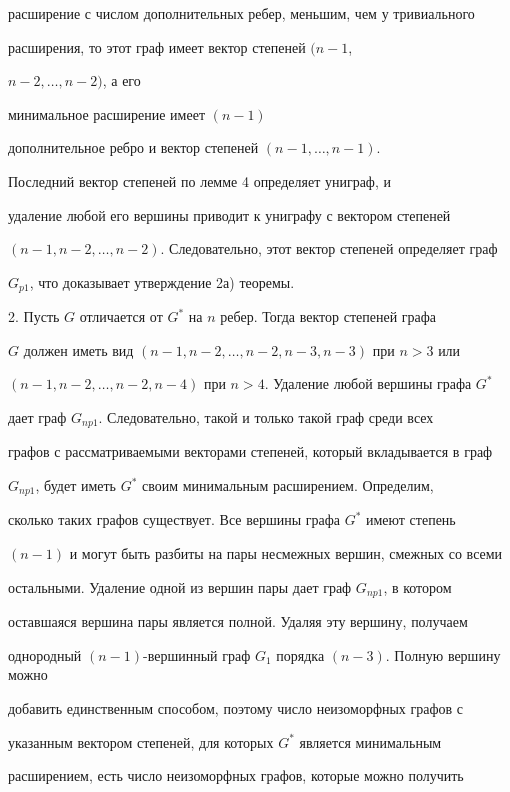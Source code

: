 \begin{pf}
расширение с числом дополнительных ребер, меньшим, чем у тривиального


расширения, то этот граф имеет вектор степеней $(n-1$,\linebreak




$n-2,\dotsc,n-2)$, а его


минимальное расширение имеет $(n-1)$


дополнительное ребро и вектор степеней $(n-1,\dotsc,n-1)$. 


Последний вектор степеней по лемме 4 определяет униграф, и


удаление любой его вершины приводит к униграфу с вектором степеней


$(n-1,n-2,\dotsc,n-2)$. Следовательно, этот вектор степеней определяет граф


$G_{p1}$, что доказывает утверждение 2а) теоремы.





2. Пусть $G$ отличается от $G^*$ на $n$ ребер. Тогда вектор степеней графа


$G$ должен иметь вид $(n-1,n-2,\dotsc,n-2,n-3,n-3)$ при $n > 3$ или


$(n-1,n-2,\dotsc,n-2,n-4)$ при $n > 4$. Удаление любой вершины графа $G^*$


дает граф $G_{np1}$. Следовательно, такой и только такой граф среди всех


графов с рассматриваемыми векторами степеней, который вкладывается в граф


$G_{np1}$, будет иметь $G^*$ своим минимальным расширением. Определим,


сколько таких графов существует. Все вершины графа $G^*$ имеют степень


$(n-1)$ и могут быть разбиты на пары несмежных вершин, смежных со всеми


остальными. Удаление одной из вершин пары дает граф $G_{np1}$, в котором


оставшаяся вершина пары является полной. Удаляя эту вершину, получаем


однородный $(n-1)$-вершинный граф $G_1$ порядка $(n-3)$. Полную вершину можно


добавить единственным способом, поэтому число неизоморфных графов с


указанным вектором степеней, для которых $G^*$ является минимальным


расширением, есть число неизоморфных графов, которые можно получить



\end{pf}
